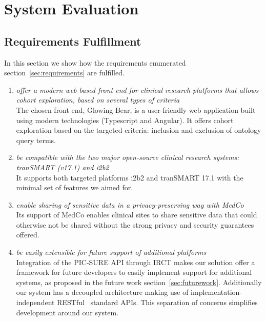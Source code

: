 \chapter{System Evaluation}
\label{sec:evaluation}

\section{Requirements Fulfillment}

In this section we show how the requirements enumerated section~\ref{sec:requirements} are fulfilled.

\begin{enumerate}
    \item \emph{offer a modern web-based front end for clinical research platforms that allows cohort exploration, based on several types of criteria} \\
    The chosen front end, Glowing Bear, is a user-friendly web application built using modern technologies (Typescript and Angular).
    It offers cohort exploration based on the targeted criteria: inclusion and exclusion of ontology query terms.
    
    \item \emph{be compatible with the two major open-source clinical research systems: tranSMART (v17.1) and i2b2} \\
    It supports both targeted platforms i2b2 and tranSMART 17.1 with the minimal set of features we aimed for.

    \item \emph{enable sharing of sensitive data in a privacy-preserving way with MedCo} \\
    Its support of MedCo enables clinical sites to share sensitive data that could otherwise not be shared without the strong privacy and security guarantees offered.

    \item \emph{be easily extensible for future support of additional platforms} \\
    Integration of the PIC-SURE API through IRCT makes our solution offer a framework for future developers to easily implement support for additional systems, as proposed in the future work section~\ref{sec:futurework}.
    Additionally our system has a decoupled architecture making use of implementation-independent RESTful~\cite{rest} standard APIs.
    This separation of concerns simplifies development around our system.


\end{enumerate}
